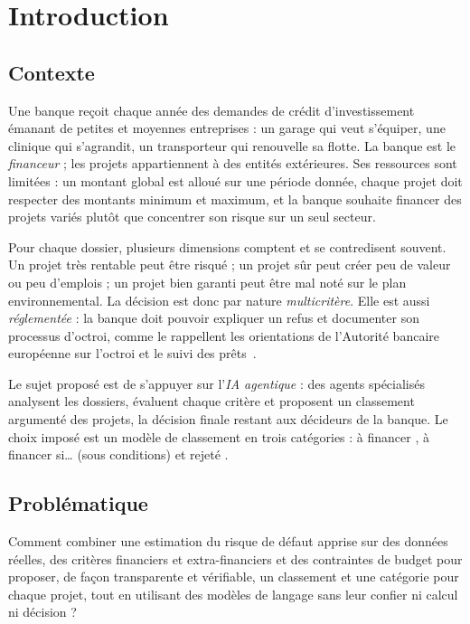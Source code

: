 \chapter{Introduction}\label{chap:intro}

\section{Contexte}

Une banque reçoit chaque année des demandes de crédit d'investissement émanant de petites et moyennes entreprises :
un garage qui veut s'équiper, une clinique qui s'agrandit, un transporteur qui renouvelle sa flotte. La banque est le
\emph{financeur} ; les projets appartiennent à des entités extérieures. Ses ressources sont limitées : un montant
global est alloué sur une période donnée, chaque projet doit respecter des montants minimum et maximum, et la banque
souhaite financer des projets variés plutôt que concentrer son risque sur un seul secteur.

Pour chaque dossier, plusieurs dimensions comptent et se contredisent souvent. Un projet très rentable peut être
risqué ; un projet sûr peut créer peu de valeur ou peu d'emplois ; un projet bien garanti peut être mal noté sur le
plan environnemental. La décision est donc par nature \emph{multicritère}. Elle est aussi
\emph{réglementée} : la banque doit pouvoir expliquer un refus et documenter son processus d'octroi, comme le
rappellent les orientations de l'Autorité bancaire européenne sur l'octroi et le suivi des prêts~\cite{eba2020}.

Le sujet proposé est de s'appuyer sur l'\emph{IA agentique} : des agents spécialisés analysent les dossiers,
évaluent chaque critère et proposent un classement argumenté des projets, la décision finale restant aux décideurs
de la banque. Le choix imposé est un modèle de classement en trois catégories : \og à financer \fg{},
\og à financer si\dots{} \fg{} (sous conditions) et \og rejeté \fg{}.

\section{Problématique}

\begin{encadre}[Problématique]
Comment combiner une estimation du risque de défaut apprise sur des données réelles, des critères financiers et
extra-financiers et des contraintes de budget pour proposer, de façon transparente et vérifiable, un classement et
une catégorie pour chaque projet, tout en utilisant des modèles de langage sans leur confier ni calcul ni décision ?
\end{encadre}

